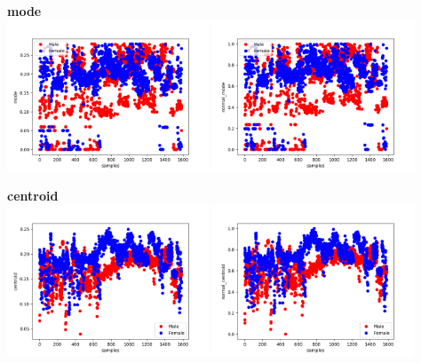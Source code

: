 \documentclass[12pt]{article}
\begin{document}
\begin{justify}
			\textbf{mode}\\
				\includegraphics[width=6cm]{../Graphs2/mode}
				\includegraphics[width=6cm]{../Graphs2/norm_mode}
				
			\textbf{centroid}\\
				\includegraphics[width=6cm]{../Graphs2/centroid}
				\includegraphics[width=6cm]{../Graphs2/norm_centroid}	
				

\end{justify}
\end{document}
